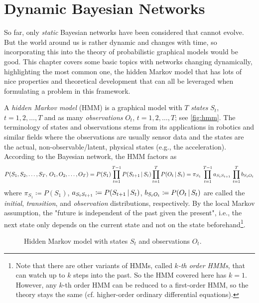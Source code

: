 \chapter{Dynamic Bayesian Networks}
	So far, only \emph{static} Bayesian networks have been considered that cannot evolve. But the world around us is rather dynamic and changes with time, so incorporating this into the theory of probabilistic graphical models would be good. This chapter covers some basic topics with networks changing dynamically, highlighting the most common one, the hidden Markov model that has lots of nice properties and theoretical development that can all be leveraged when formulating a problem in this framework.

	A \emph{hidden Markov model} (HMM) is a graphical model with \(T\) \emph{states} \(S_t\), \( t = 1, 2, \dots, T \) and as many \emph{observations} \(O_t\), \( t = 1, 2, \dots, T \); see \autoref{fig:hmm}. The terminology of states and observations stems from its applications in robotics and similar fields where the observations are usually sensor data and the states are the actual, non-observable/latent, physical states (e.g., the acceleration). According to the Bayesian network, the HMM factors as
	\begin{equation}
		P(S_1, S_2, \dots, S_T,\, O_1, O_2, \dots, O_T)
		= P(S_1) \prod_{t = 1}^{T - 1} P(S_{t + 1} \,\vert\, S_t) \prod_{t = 1}^{T} P(O_t \,\vert\, S_t)
		= \pi_{S_1} \, \prod_{t = 1}^{T - 1} a_{S_t S_{t + 1}} \, \prod_{t = 1}^{T} b_{S_t O_t}  \label{eqn:hmmFactor}
	\end{equation}
	where \( \pi_{S_1} \coloneqq P(S_1) \), \( a_{S_t S_{t + 1}} \coloneqq P(S_{t + 1} \,\vert\, S_t) \), \( b_{S_t O_t} \coloneqq P(O_t \,\vert\, S_t) \) are called the \emph{initial}, \emph{transition}, and \emph{observation} distributions, respectively. By the local Markov assumption, the "future is independent of the past given the present", i.e., the next state only depends on the current state and not on the state beforehand\footnote{Note that there are other variants of HMMs, called \emph{\(k\)-th order HMMs}, that can watch up to \(k\) steps into the past. So the HMM covered here has \(k = 1\). However, any \(k\)-th order HMM can be reduced to a first-order HMM, so the theory stays the same (cf. higher-order ordinary differential equations).}.

	\begin{figure}
		\centering
		\caption[Hidden Markov Model]{Hidden Markov model with states \( S_t \) and observations \( O_t \).}
		\label{fig:hmm}
	\end{figure}

